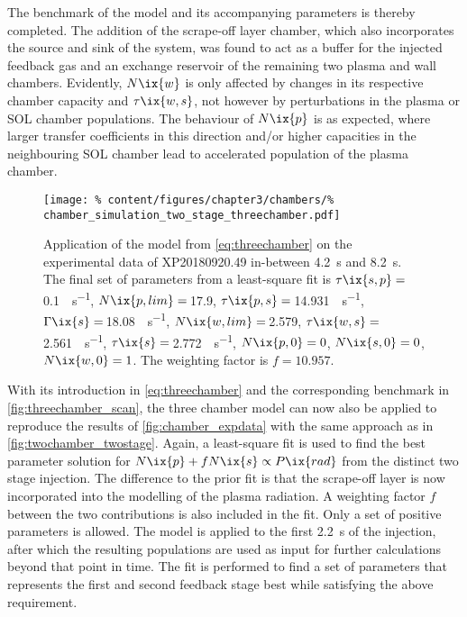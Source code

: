             The benchmark of the model and its accompanying parameters is thereby completed. The addition of the scrape-off layer chamber, which also incorporates the source and sink of the system, was found to act as a buffer for the injected feedback gas and an exchange reservoir of the remaining two plasma and wall chambers. Evidently, $N\ix{w}$ is only affected by changes in its respective chamber capacity and $\tau\ix{w,s}$, not however by perturbations in the plasma or SOL chamber populations. The behaviour of $N\ix{p}$ is as expected, where larger transfer coefficients in this direction and/or higher capacities in the neighbouring SOL chamber lead to accelerated population of the plasma chamber.\\%
%
            \begin{figure}[t]%
                \centering%
                \texttt{[image: \%
                    content/figures/chapter3/chambers/\%
                    chamber\_simulation\_two\_stage\_threechamber.pdf]}%
                \caption{Application of the model from \cref{eq:threechamber} on the experimental data of XP20180920.49 in-between \SI{4.2}{\second} and \SI{8.2}{\second}. The final set of parameters from a least-square fit is $\tau\ix{s,p}=$\,\SI{0.1}{\arbitraryunit\per\second}, $N\ix{p,lim}=$\,\SI{17.9}{\arbitraryunit}, $\tau\ix{p,s}=$\,\SI{14.931}{\arbitraryunit\per\second}, $\Gamma\ix{s}=$\,\SI{18.08}{\arbitraryunit\per\second},  $N\ix{w,lim}=$\,\SI{2.579}{\arbitraryunit}, $\tau\ix{w,s}=$\,\SI{2.561}{\arbitraryunit\per\second}, $\tau\ix{s}=$\,\SI{2.772}{\arbitraryunit\per\second}, $N\ix{p,0}=0$, $N\ix{s,0}=0$, $N\ix{w,0}=1$. The weighting factor is $f=10.957$.}\label{fig:threechamber_twostage}%
            \end{figure}%
%
            With its introduction in \cref{eq:threechamber} and the corresponding benchmark in \cref{fig:threechamber_scan}, the three chamber model can now also be applied to reproduce the results of \cref{fig:chamber_expdata} with the same approach as in \cref{fig:twochamber_twostage}. Again, a least-square fit is used to find the best parameter solution for $N\ix{p}+fN\ix{s}\propto P\ix{rad}$ from the distinct two stage injection. The difference to the prior fit is that the scrape-off layer is now incorporated into the modelling of the plasma radiation. A weighting factor $f$ between the two contributions is also included in the fit. Only a set of positive parameters is allowed. The model is applied to the first \SI{2.2}{\second} of the injection, after which the resulting populations are used as input for further calculations beyond that point in time. The fit is performed to find a set of parameters that represents the first and second feedback stage best while satisfying the above requirement.\\%
